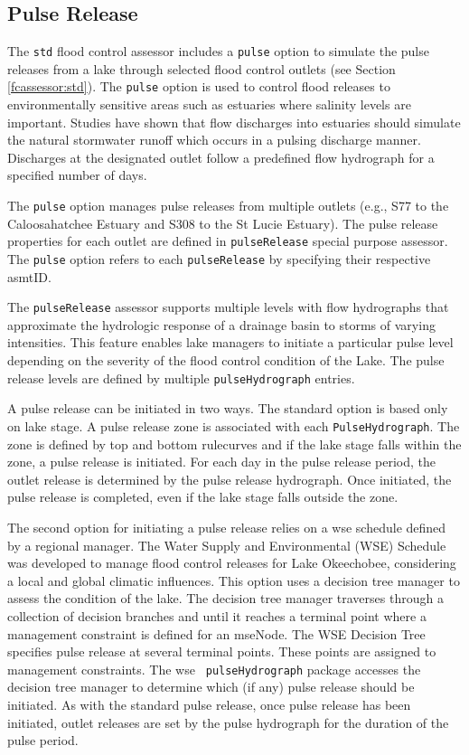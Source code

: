 \subsection{Pulse Release}
The {\tt std} flood control assessor includes a {\tt pulse} option
to simulate the pulse releases from a lake through selected flood
control outlets (see Section \ref{fcassessor:std}).  The {\tt pulse}
option is used to control flood releases to environmentally sensitive
areas such as estuaries where salinity levels are important.  Studies
have shown that flow discharges into estuaries should simulate the
natural stormwater runoff which occurs in a pulsing discharge manner.
Discharges at the designated outlet follow a predefined flow
hydrograph for a specified number of days.

The {\tt pulse} option manages pulse releases from multiple outlets
(e.g., S77 to the Caloosahatchee Estuary and S308 to the St Lucie
Estuary).  The pulse release properties for each outlet are defined in
{\tt pulseRelease} special purpose assessor.  The {\tt pulse} option
refers to each {\tt pulseRelease} by specifying their respective
asmtID.

The {\tt pulseRelease} assessor supports multiple levels with flow
hydrographs that approximate the hydrologic response of a drainage
basin to storms of varying intensities.  This feature enables lake
managers to initiate a particular pulse level depending on the
severity of the flood control condition of the Lake.  The pulse
release levels are defined by multiple {\tt pulseHydrograph}
entries.

A pulse release can be initiated in two ways.  The standard option is
based only on lake stage.  A pulse release zone is associated with
each {\tt PulseHydrograph}.  The zone is defined by top and bottom
rulecurves and if the lake stage falls within the zone, a pulse
release is initiated.  For each day in the pulse release period, the
outlet release is determined by the pulse release hydrograph.  Once
initiated, the pulse release is completed, even if the lake stage falls
outside the zone.

The second option for initiating a pulse release relies on a wse
schedule defined by a regional manager.  The Water Supply and
Environmental (WSE) Schedule was developed to manage flood control
releases for Lake Okeechobee, considering a local and global climatic
influences.  This option uses a decision tree manager to assess the
condition of the lake. The decision tree manager traverses through a
collection of decision branches and until it reaches a terminal point
where a management constraint is defined for an mseNode.  The WSE
Decision Tree specifies pulse release at several terminal points.
These points are assigned to management constraints.  The wse {\tt
pulseHydrograph} package accesses the decision tree manager to
determine which (if any) pulse release should be initiated.  As with
the standard pulse release, once pulse release has been initiated,
outlet releases are set by the pulse hydrograph for the duration of
the pulse period.

